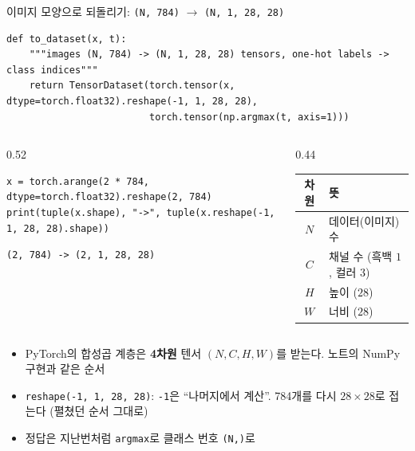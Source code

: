 \documentclass[aspectratio=169,11pt]{beamer}
\newcommand{\code}[1]{\texttt{#1}}
\begin{document}
\begin{frame}{이미지 모양으로 되돌리기: \code{(N, 784)} $\to$ \code{(N, 1, 28, 28)}}
\begin{lstlisting}
def to_dataset(x, t):
    """images (N, 784) -> (N, 1, 28, 28) tensors, one-hot labels -> class indices"""
    return TensorDataset(torch.tensor(x, dtype=torch.float32).reshape(-1, 1, 28, 28),
                         torch.tensor(np.argmax(t, axis=1)))
\end{lstlisting}
\begin{columns}[T,onlytextwidth]
\begin{column}{0.52\textwidth}
\begin{lstlisting}
x = torch.arange(2 * 784, dtype=torch.float32).reshape(2, 784)
print(tuple(x.shape), "->", tuple(x.reshape(-1, 1, 28, 28).shape))
\end{lstlisting}
\begin{lstlisting}[style=outstyle]
(2, 784) -> (2, 1, 28, 28)
\end{lstlisting}
\end{column}
\begin{column}{0.44\textwidth}
\centering
\small
\renewcommand{\arraystretch}{1.15}
\begin{tabular}{cl}
\toprule
\textbf{차원} & \textbf{뜻} \\
\midrule
$N$ & 데이터(이미지) 수 \\
$C$ & 채널 수 (흑백 $1$, 컬러 $3$) \\
$H$ & 높이 ($28$) \\
$W$ & 너비 ($28$) \\
\bottomrule
\end{tabular}
\end{column}
\end{columns}
\vskip1mm
\small
\begin{itemize}
\item PyTorch의 합성곱 계층은 \textbf{4차원} 텐서 $(N,C,H,W)$를 받는다. 노트의 NumPy 구현과 같은 순서
\item \code{reshape(-1, 1, 28, 28)}: \code{-1}은 ``나머지에서 계산''. 784개를 다시 $28\times28$로 접는다 (펼쳤던 순서 그대로)
\item 정답은 지난번처럼 \code{argmax}로 클래스 번호 \code{(N,)}로
\end{itemize}
\end{frame}
\end{document}
